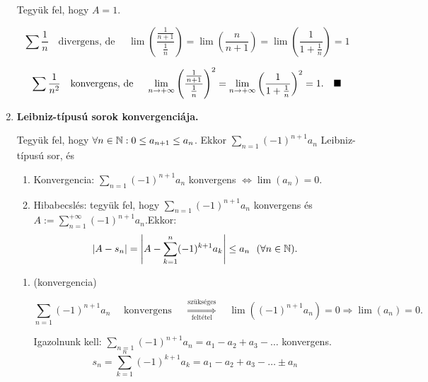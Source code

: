 \documentclass[a4paper,11.5pt]{article}
\begin{document}
\begin{enumerate}
		Tegyük fel, hogy $A=1$.
		
		\[ \sum\frac{1}{n}\quad \text{divergens, de }\quad \lim\left(\frac{\frac{1}{n+1}}{\frac{1}{n}}\right)=\lim\left(\frac{n}{n+1}\right)=\lim\left(\frac{1}{1+\frac{1}{n}}\right)=1 \]
		
		\[ \sum\frac{1}{n^2}\quad \text{konvergens, de }\quad \displaystyle\lim_{n\to +\infty}\left(\frac{\frac{1}{n+1}}{\frac{1}{n}}\right)^2=\displaystyle\lim_{n\to +\infty}\left(\frac{1}{1+\frac{1}{n}}\right)^2=1. \quad\blacksquare \]
		
		\item \textbf{Leibniz-típusú sorok konvergenciája.}
		
		Tegyük fel, hogy $ \forall n \in \mathbb{N} : 0 \leq a_{n+1}\leq a_{n}$. Ekkor $\displaystyle\sum_{n=1} (-1)^{n+1} a_n$ Leibniz-típusú sor, és
		
		\begin{enumerate}
			\item Konvergencia: $\displaystyle\sum_{n=1} (-1)^{n+1} a_n$ konvergens $\Leftrightarrow \lim(a_n)=0$.
			
			\smallskip
			\item Hibabecslés: tegyük fel, hogy $\displaystyle\sum_{n=1} (-1)^{n+1} a_n$ konvergens és \\ $A:=\displaystyle \sum_{n=1}^{+\infty} (-1)^{n+1} a_n$.\quad 	Ekkor:
			\[|A-s_n|=\left|A-\displaystyle \sum_{k=1}^{n} (-1)^{k+1} a_k\right| \leq a_n~~ (\forall n \in \mathbb{N}).\]
		\end{enumerate}
		
		\biz 
		\begin{enumerate}
			\item (konvergencia)
			
			\fbox{$\Rightarrow:$}
			\[ \sum_{n=1} (-1)^{n+1}a_n\quad \text{ konvergens } \quad\overset{\text{szükséges}}{\underset{\text{feltétel}}{\Longrightarrow}}\quad\lim\left((-1)^{n+1}a_n\right)=0 \Rightarrow \lim(a_n)=0. \]
			\fbox{$\Leftarrow:$}
			
			Igazolnunk kell: $\displaystyle\sum_{n=1}(-1)^{n+1}a_n=a_1-a_2+a_3-\ldots$ konvergens.
			\[ s_n=\sum_{k=1}^n(-1)^{k+1}a_k=a_1-a_2+a_3-\ldots\pm a_n \]
			

\end{enumerate}
\end{enumerate}
\end{document}
